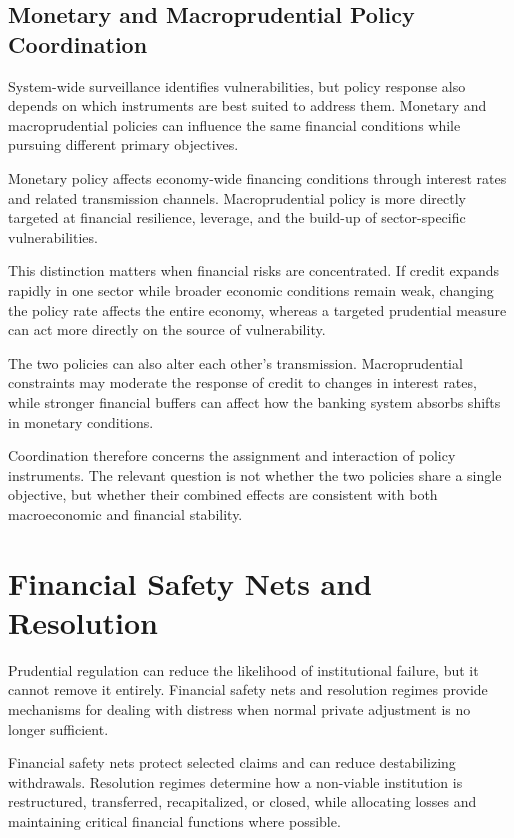 \subsection{Monetary and Macroprudential Policy Coordination}

System-wide surveillance identifies vulnerabilities, but policy response also depends on which instruments are best suited to address them. Monetary and macroprudential policies can influence the same financial conditions while pursuing different primary objectives.

Monetary policy affects economy-wide financing conditions through interest rates and related transmission channels. Macroprudential policy is more directly targeted at financial resilience, leverage, and the build-up of sector-specific vulnerabilities.

This distinction matters when financial risks are concentrated. If credit expands rapidly in one sector while broader economic conditions remain weak, changing the policy rate affects the entire economy, whereas a targeted prudential measure can act more directly on the source of vulnerability.

The two policies can also alter each other's transmission. Macroprudential constraints may moderate the response of credit to changes in interest rates, while stronger financial buffers can affect how the banking system absorbs shifts in monetary conditions.

Coordination therefore concerns the assignment and interaction of policy instruments. The relevant question is not whether the two policies share a single objective, but whether their combined effects are consistent with both macroeconomic and financial stability.


\section{Financial Safety Nets and Resolution}

Prudential regulation can reduce the likelihood of institutional failure, but it cannot remove it entirely. Financial safety nets and resolution regimes provide mechanisms for dealing with distress when normal private adjustment is no longer sufficient.

Financial safety nets protect selected claims and can reduce destabilizing withdrawals. Resolution regimes determine how a non-viable institution is restructured, transferred, recapitalized, or closed, while allocating losses and maintaining critical financial functions where possible.

